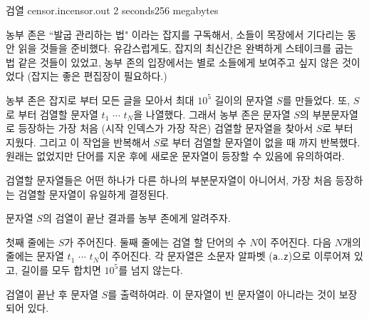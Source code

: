 \begin{problem}{검열}
	{censor.in}{censor.out}
	{2 seconds}{256 megabytes}{}
	
	농부 존은 ``발굽 관리하는 법" 이라는 잡지를 구독해서, 소들이 목장에서 기다리는 동안 읽을 것들을 준비했다. 유감스럽게도, 잡지의 최신간은 완벽하게 스테이크를 굽는 법 같은 것들이 있었고, 농부 존의 입장에서는 별로 소들에게 보여주고 싶지 않은 것이었다 (잡지는 좋은 편집장이 필요하다.)
	
	농부 존은 잡지로 부터 모든 글을 모아서 최대 $10^5$ 길이의 문자열 $S$를 만들었다. 또, $S$로 부터 검열할 문자열 $t_1$ $\cdots$ $t_N$을 나열했다. 그래서 농부 존은 문자열 $S$의 부분문자열로 등장하는 가장 처음 (시작 인덱스가 가장 작은) 검열할 문자열을 찾아서 $S$로 부터 지웠다. 그리고 이 작업을 반복해서 $S$로 부터 검열할 문자열이 없을 때 까지 반복했다. 원래는 없었지만 단어를 지운 후에 새로운 문자열이 등장할 수 있음에 유의하여라.
	
	검열할 문자열들은 어떤 하나가 다른 하나의 부분문자열이 아니어서, 가장 처음 등장하는 검열할 문자열이 유일하게 결정된다.
	
	문자열 $S$의 검열이 끝난 결과를 농부 존에게 알려주자.
	


	
	\InputFile
	
	첫째 줄에는 $S$가 주어진다. 둘째 줄에는 검열 할 단어의 수 $N$이 주어진다. 다음 $N$개의 줄에는 문자열 $t_1$ $\cdots$ $t_N$이 주어진다.	각 문자열은 소문자 알파벳 (\texttt{a}..\texttt{z})으로 이루어져 있고, 길이를 모두 합치면 $10^5$를 넘지 않는다.
	
	\OutputFile
	
	검열이 끝난 후 문자열 $S$를 출력하여라. 이 문자열이 빈 문자열이 아니라는 것이 보장되어 있다.
	
	\Examples
		
	\begin{example}
	\end{example}

	
	
	
\end{problem}

